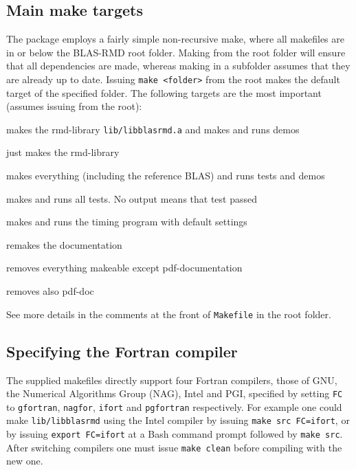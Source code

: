 \documentclass[a4paper]{article}
\begin{document}
\subsection{Main make targets}

The package employs a fairly simple non-recursive make, where all makefiles are
in or below the BLAS-RMD root folder. Making from the root folder will
ensure that all dependencies are made, whereas making in a subfolder assumes
that they are already up to date. Issuing \texttt{make <folder>} from the root
makes the default target of the specified folder. The following targets
are the most important (assumes issuing from the root):

\begin{description}[labelwidth=2.6cm]
\item[make] makes the rmd-library \texttt{lib/libblasrmd.a} and makes and runs demos
\item[make src] just makes the rmd-library
\item[make all] makes everything (including the reference BLAS) and runs tests and demos
\item[make testrun] makes and runs all tests. No output means that test passed
\item[make timerun] makes and runs the timing program with default settings
\item[make doc] remakes the documentation
\item[make clean] removes everything makeable except pdf-documentation
\item[make clean-all] removes also pdf-doc
\end{description}

\noindent
See more details in the comments at the front of \texttt{Makefile} in the root folder.

\subsection{Specifying the Fortran compiler}
The supplied makefiles directly support four Fortran compilers, those of GNU,
the Numerical Algorithms Group (NAG), Intel and PGI, specified by setting
\texttt{FC} to \texttt{gfortran}, \texttt{nagfor}, \texttt{ifort} and
\texttt{pgfortran} respectively. For example one could make
\texttt{lib/libblasrmd} using the Intel compiler by issuing \texttt{make src
  FC=ifort}, or by issuing \texttt{export FC=ifort} at a Bash command prompt
followed by \texttt{make src}. After switching compilers one must issue
\texttt{make clean} before compiling with the new one.
\end{document}
